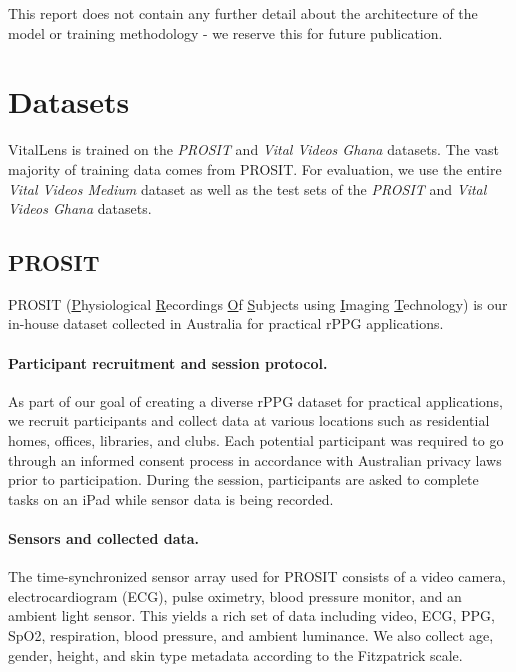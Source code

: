 \documentclass{article}
\begin{document}
This report does not contain any further detail about the architecture of the model or training methodology -
we reserve this for future publication.

\section{Datasets}
\label{headings}

VitalLens is trained on the \textit{PROSIT} and \textit{Vital Videos Ghana} datasets.
The vast majority of training data comes from PROSIT.
For evaluation, we use the entire \textit{Vital Videos Medium} dataset as well as the test sets of the \textit{PROSIT} and \textit{Vital Videos Ghana} datasets.

\subsection{PROSIT}

PROSIT (\underline{P}hysiological \underline{R}ecordings \underline{O}f \underline{S}ubjects using \underline{I}maging \underline{T}echnology) is our in-house dataset collected in Australia for practical rPPG applications.

\paragraph{Participant recruitment and session protocol.} 
As part of our goal of creating a diverse rPPG dataset for practical applications, we recruit participants and collect data at various locations such as residential homes, offices, libraries, and clubs.
Each potential participant was required to go through an informed consent process in accordance with Australian privacy laws prior to participation.
During the session, participants are asked to complete tasks on an iPad while sensor data is being recorded.

\paragraph{Sensors and collected data.}
The time-synchronized sensor array used for PROSIT consists of a video camera, electrocardiogram (ECG), pulse oximetry, blood pressure monitor, and an ambient light sensor.
This yields a rich set of data including video, ECG, PPG, SpO2, respiration, blood pressure, and ambient luminance.
We also collect age, gender, height, and skin type metadata according to the Fitzpatrick scale.
\end{document}
